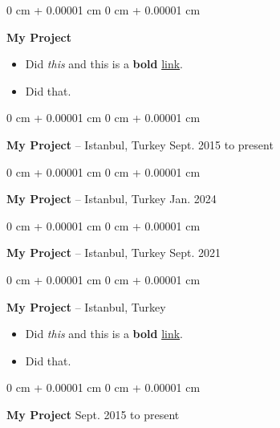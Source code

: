 \documentclass[10pt, letterpaper]{article}
\newenvironment{highlights}{
    \begin{itemize}[
        topsep=0.10 cm,
        parsep=0.10 cm,
        partopsep=0pt,
        itemsep=0pt,
        leftmargin=0 cm + 10pt
    ]
}{
    \end{itemize}
        
    \vspace{-0.20cm}
} %
\newenvironment{onecolentry}{
    \begin{adjustwidth}{
        0 cm + 0.00001 cm
    }{
        0 cm + 0.00001 cm
    }
}{
    \end{adjustwidth}
} %
\begin{document}
        \begin{onecolentry}
            \textbf{My Project} \hfill 
            \begin{highlights}
                \item Did \textit{this} and this is a \textbf{bold} \href{https://example.com}{link}.
                \item Did that.
            \end{highlights}
        \end{onecolentry}

        \vspace{0.1 cm}

        \begin{onecolentry}
            \textbf{My Project} -- Istanbul, Turkey \hfill Sept. 2015 to present
        \end{onecolentry}

        \vspace{0.1 cm}

        \begin{onecolentry}
            \textbf{My Project} -- Istanbul, Turkey \hfill Jan. 2024
        \end{onecolentry}

        \vspace{0.1 cm}

        \begin{onecolentry}
            \textbf{My Project} -- Istanbul, Turkey \hfill Sept. 2021
        \end{onecolentry}

        \vspace{0.1 cm}

        \begin{onecolentry}
            \textbf{My Project} -- Istanbul, Turkey \hfill 
            \begin{highlights}
                \item Did \textit{this} and this is a \textbf{bold} \href{https://example.com}{link}.
                \item Did that.
            \end{highlights}
        \end{onecolentry}

        \vspace{0.1 cm}

        \begin{onecolentry}
            \textbf{My Project} \hfill Sept. 2015 to present
        \end{onecolentry}
\end{document}
